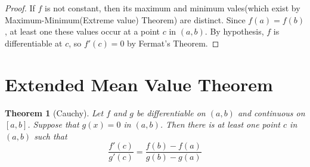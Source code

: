 \documentclass[a4paper]{amsproc}
\theoremstyle{plain}
\newtheorem{thm}{Theorem}[section]
\numberwithin{equation}{section} %
\numberwithin{figure}{section} %
\theoremstyle{plain}
\theoremstyle{definition}
\theoremstyle{definition}
\theoremstyle{remark}
\newtheorem{rem}[thm]{Remark}
\begin{document}
\begin{proof}
If $f$ is not constant, then its maximum and minimum vales(which exist by Maximum-Minimum(Extreme value) Theorem) are distinct.
Since $f(a)=f(b)$, at least one these values occur at a point $c$ in $(a,b)$. By hypothesis, $f$ is differentiable at $c$, so $f'(c)=0$
by Fermat's Theorem.
\end{proof}

\section{Extended Mean Value Theorem}



\begin{thm}[Cauchy]
Let $f$ and $g$ be differentiable on $(a, b)$ and continuous on $[a, b]$. Suppose that $g(x)=0$   in $(a, b)$. Then there is at least one point $c$ in $(a, b)$ such that
\[\frac{f'(c)}{g'(c)}=\frac{f(b)-f(a)}{g(b)-g(a)}\]
\end{thm}
\end{document}
